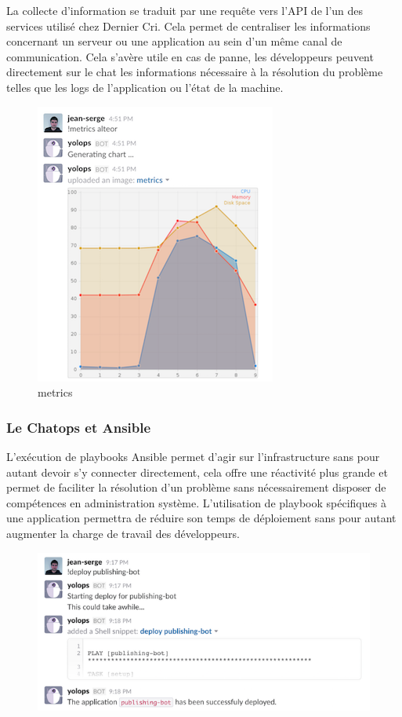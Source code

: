 \bigskip

La collecte d'information se traduit par une requête vers l'API de l'un
des services utilisé chez Dernier Cri. Cela permet de centraliser les
informations concernant un serveur ou une application au sein d'un même
canal de communication. Cela s'avère utile en cas de panne, les
développeurs peuvent directement sur le chat les informations nécessaire
à la résolution du problème telles que les logs de l'application ou
l'état de la machine.

\begin{figure}[htbp]
\centering
\includegraphics{metrics.png}
\caption{metrics}
\end{figure}

\newpage

\subsubsection{Le Chatops et Ansible}\label{le-chatops-et-ansible}

\bigskip

L'exécution de playbooks Ansible permet d'agir sur l'infrastructure sans
pour autant devoir s'y connecter directement, cela offre une réactivité
plus grande et permet de faciliter la résolution d'un problème sans
nécessairement disposer de compétences en administration système.
L'utilisation de playbook spécifiques à une application permettra de
réduire son temps de déploiement sans pour autant augmenter la charge de
travail des développeurs.

\begin{figure}[htbp]
\centering
\includegraphics{deploy.png}
\caption{}
\end{figure}

